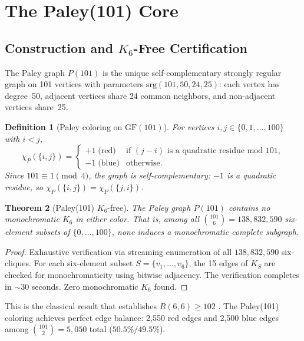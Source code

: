 \documentclass[11pt,a4paper]{article}
\theoremstyle{plain}
\newtheorem{theorem}{Theorem}[section]
\newtheorem{definition}[theorem]{Definition}
\theoremstyle{remark}
\newcommand{\GF}{\mathrm{GF}}
\begin{document}
\section{The Paley(101) Core}
\label{sec:paley}

\subsection{Construction and $K_6$-Free Certification}

The Paley graph $P(101)$ is the unique self-complementary
strongly regular graph on 101 vertices with parameters
$\mathrm{srg}(101, 50, 24, 25)$: each vertex has degree~50,
adjacent vertices share 24 common neighbors, and non-adjacent
vertices share~25.

\begin{definition}[Paley coloring on $\GF(101)$]\label{def:paley101}
For vertices $i,j \in \{0, 1, \ldots, 100\}$ with $i < j$,
\[
  \chi_P(\{i,j\}) =
  \begin{cases}
    +1 \;\text{(red)} & \text{if } (j - i) \text{ is a quadratic residue mod } 101, \\
    -1 \;\text{(blue)} & \text{otherwise}.
  \end{cases}
\]
Since $101 \equiv 1 \pmod{4}$, the graph is self-complementary:
$-1$ is a quadratic residue, so $\chi_P(\{i,j\}) = \chi_P(\{j,i\})$.
\end{definition}

\begin{theorem}[Paley(101) $K_6$-free]\label{thm:paleycore}
The Paley graph $P(101)$ contains no monochromatic $K_6$ in either
color. That is, among all $\binom{101}{6} = 138{,}832{,}590$ six-element
subsets of $\{0, \ldots, 100\}$, none induces a monochromatic
complete subgraph.
\end{theorem}

\begin{proof}
Exhaustive verification via streaming enumeration of all
$138{,}832{,}590$ six-cliques. For each six-element subset
$S = \{v_1, \ldots, v_6\}$, the 15 edges of $K_S$ are checked
for monochromaticity using bitwise adjacency. The verification
completes in ${\sim}30$ seconds. Zero monochromatic $K_6$ found.
\end{proof}

This is the classical result that establishes $R(6,6) \geq 102$
\cite{radziszowski2021}. The Paley(101) coloring achieves perfect
edge balance: 2{,}550 red edges and 2{,}500 blue edges among
$\binom{101}{2} = 5{,}050$ total ($50.5\%/49.5\%$).
\end{document}
